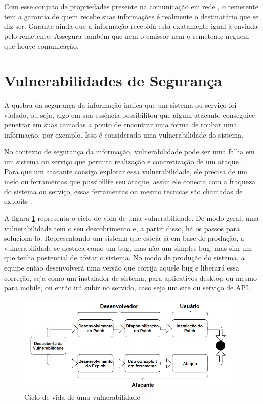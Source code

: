 Com esse conjuto de propriedades presente na comunicação em rede \cite{ABNT2005}, o remetente tem a garantia de quem recebe suas informações é realmente o destinatário que se diz ser. Garante ainda que a informação recebida está exatamente igual à enviada pelo remetente. Assegura também que nem o emissor nem o remetente neguem que houve comunicação.

\section{Vulnerabilidades de Segurança}
A quebra da segurança da informação indica que um sistema ou serviço foi violado, ou seja, algo em sua essência possibilitou que algum atacante conseguice penetrar em suas camadas a ponto de encontrar uma forma de roubar uma informação, por exemplo. Isso é considerado uma vulnerabilidade do sistema. 

No contexto de segurança da informação, vulnerabilidade pode ser uma falha em um sistema ou serviço que permita realização e concretização de um ataque \cite{Aparecido2014}. Para que um atacante consiga explorar essa vulnerabilidade, ele precisa de um meio ou ferramentas que possibilite seu ataque, assim ele conecta com a fraqueza do sistema ou serviço, essas ferramentas ou mesmo tecnicas são chamadas de exploits \cite{Whitman2011}.

A figura \ref{fig:xiao} representa o ciclo de vida de uma vulnerabilidade. De modo geral, uma vulnerabilidade tem o seu descobrimento e, a partir disso, há os passos para soluciona-lo. Representando um sistema que esteja já em base de produção, a vulnerabilidade se destaca como um bug, mas não um simples bug, mas sim um que tenha postencial de afetar o sistema. No modo de produção do sistema, a equipe então desenvolverá uma versão que corrija aquele bug e liberará essa correção, seja como um instalador de sistema, para aplicativos desktop ou mesmo para mobile, ou então irá subir no servido, caso seja um site ou serviço de API. 

\begin{figure}[H]
\centering
\includegraphics[width=1\textwidth]{imagens/figura_xiao.PNG}
\caption{Ciclo de vida de uma vulnerabilidade \cite{xiao2018patching}}
\label{fig:xiao}
\end{figure}

